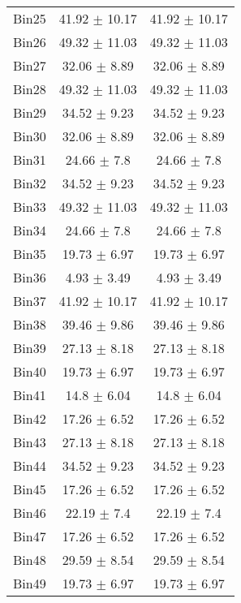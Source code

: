 \begin{tabular}{|c|c|c|}
     Bin25 & 41.92 $\pm$ 10.17 & 41.92 $\pm$ 10.17 \\ \cline{1-3} 
     Bin26 & 49.32 $\pm$ 11.03 & 49.32 $\pm$ 11.03 \\ \cline{1-3} 
     Bin27 & 32.06 $\pm$ 8.89 & 32.06 $\pm$ 8.89 \\ \cline{1-3} 
     Bin28 & 49.32 $\pm$ 11.03 & 49.32 $\pm$ 11.03 \\ \cline{1-3} 
     Bin29 & 34.52 $\pm$ 9.23 & 34.52 $\pm$ 9.23 \\ \cline{1-3} 
     Bin30 & 32.06 $\pm$ 8.89 & 32.06 $\pm$ 8.89 \\ \cline{1-3} 
     Bin31 & 24.66 $\pm$ 7.8 & 24.66 $\pm$ 7.8 \\ \cline{1-3} 
     Bin32 & 34.52 $\pm$ 9.23 & 34.52 $\pm$ 9.23 \\ \cline{1-3} 
     Bin33 & 49.32 $\pm$ 11.03 & 49.32 $\pm$ 11.03 \\ \cline{1-3} 
     Bin34 & 24.66 $\pm$ 7.8 & 24.66 $\pm$ 7.8 \\ \cline{1-3} 
     Bin35 & 19.73 $\pm$ 6.97 & 19.73 $\pm$ 6.97 \\ \cline{1-3} 
     Bin36 & 4.93 $\pm$ 3.49 & 4.93 $\pm$ 3.49 \\ \cline{1-3} 
     Bin37 & 41.92 $\pm$ 10.17 & 41.92 $\pm$ 10.17 \\ \cline{1-3} 
     Bin38 & 39.46 $\pm$ 9.86 & 39.46 $\pm$ 9.86 \\ \cline{1-3} 
     Bin39 & 27.13 $\pm$ 8.18 & 27.13 $\pm$ 8.18 \\ \cline{1-3} 
     Bin40 & 19.73 $\pm$ 6.97 & 19.73 $\pm$ 6.97 \\ \cline{1-3} 
     Bin41 & 14.8 $\pm$ 6.04 & 14.8 $\pm$ 6.04 \\ \cline{1-3} 
     Bin42 & 17.26 $\pm$ 6.52 & 17.26 $\pm$ 6.52 \\ \cline{1-3} 
     Bin43 & 27.13 $\pm$ 8.18 & 27.13 $\pm$ 8.18 \\ \cline{1-3} 
     Bin44 & 34.52 $\pm$ 9.23 & 34.52 $\pm$ 9.23 \\ \cline{1-3} 
     Bin45 & 17.26 $\pm$ 6.52 & 17.26 $\pm$ 6.52 \\ \cline{1-3} 
     Bin46 & 22.19 $\pm$ 7.4 & 22.19 $\pm$ 7.4 \\ \cline{1-3} 
     Bin47 & 17.26 $\pm$ 6.52 & 17.26 $\pm$ 6.52 \\ \cline{1-3} 
     Bin48 & 29.59 $\pm$ 8.54 & 29.59 $\pm$ 8.54 \\ \cline{1-3} 
     Bin49 & 19.73 $\pm$ 6.97 & 19.73 $\pm$ 6.97 \\ \cline{1-3} 

\end{tabular}
